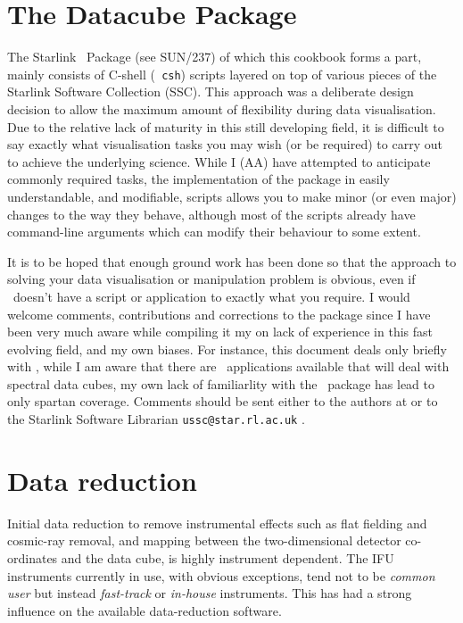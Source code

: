 \documentclass[twoside,11pt]{article}
\newcommand{\htmladdnormallink}[2]{#1}
\newenvironment{latexonly}{}{}
\newcommand{\xref}[3]{#1}
\newcommand{\xlabel}[1]{}
\begin{document}
\section{\xlabel{sc16_datacubepackage}The Datacube Package\label{sc16_datacubepackage}}

The \htmladdnormallink{Starlink}{http://www.starlink.ac.uk/} 
\DATACUBEref\ Package 
\begin{latexonly}
(see SUN/237)
\end{latexonly}
of which this cookbook forms a part, mainly consists of C-shell ({\tt
csh}) scripts layered on top of various pieces of the Starlink
Software Collection (SSC).  This approach was a deliberate design
decision to allow the maximum amount of flexibility during data
visualisation.  Due to the relative lack of maturity in this still
developing field, it is difficult to say exactly what visualisation
tasks you may wish (or be required) to carry out to achieve the
underlying science.  While I (AA) have attempted to anticipate commonly
required tasks, the implementation of the package in easily
understandable, and modifiable, scripts allows you to make minor (or
even major) changes to the way they behave, although most of the
scripts already have \xref{command-line arguments}{sun237}{} which
can modify their behaviour to some extent\latexonly{ (see SUN/237 for
details)}.

It is to be hoped that enough ground work has been done so that the
approach to solving your data visualisation or manipulation problem is
obvious, even if \DATACUBE\ doesn't have a script or application to
exactly what you require.  I would welcome comments, contributions and
corrections to the package since I have been very much aware while
compiling it my on lack of experience in this fast evolving field, and
my own biases.  For instance, this document deals only briefly with
\IRAFref, while I am aware that there are \IRAF\ applications
available that will deal with spectral data cubes, my own lack of
familiarlity with the \IRAF\ package has lead to only spartan
coverage.  Comments should be sent either to the authors at or to
the Starlink Software Librarian
\htmladdnormallink{{\tt ussc@star.rl.ac.uk} }{mailto:ussc@star.rl.ac.uk}.

\section{\xlabel{sc16_reduction}Data reduction\label{sc16_reduction}}

Initial data reduction to remove instrumental effects such as flat
fielding and cosmic-ray removal, and mapping between the
two-dimensional detector co-ordinates and the data cube, is highly
instrument dependent.  The IFU instruments currently in use, with
obvious exceptions, tend not to be {\em common user} but instead {\em
fast-track} or {\em in-house} instruments.  This has had a strong
influence on the available data-reduction software.
\end{document}
